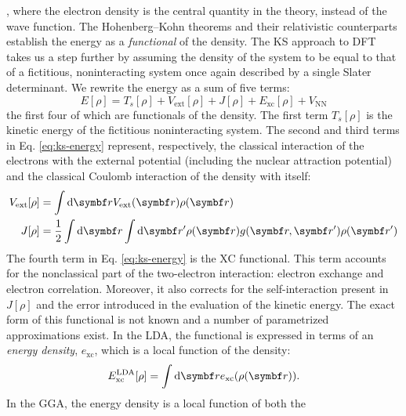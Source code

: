 , where the electron density
is the central quantity in the theory, instead of the wave function.
The Hohenberg--Kohn theorems\autocite{Hohenberg1964-wo, Eschrig2012-as}
and their relativistic counterparts\autocite{Rajagopal1973-ns,
Dreizler2012-ay} establish the energy as a \emph{functional} of the
density.
The \gls{KS} approach to \acrshort{DFT} takes us a step further by
assuming the density of the system to be equal to that of a fictitious,
noninteracting system once again described by a single Slater
determinant.\autocite{Kohn1965-hg}
We rewrite the energy as a sum of five terms:
\begin{equation}\label{eq:ks-energy}
 E[\rho] = T_s[\rho] + V_\mathrm{ext}[\rho] + J[\rho] + E_\mathrm{xc}[\rho] + V_\mathrm{NN}
\end{equation}
the first four of which are functionals of the density. The first term
$T_s[\rho]$ is the kinetic energy of the fictitious noninteracting
system.
The second and third terms in Eq. \eqref{eq:ks-energy} represent,
respectively, the classical interaction of the electrons with the
external potential (including the nuclear attraction potential) and the
classical Coulomb interaction of the density with itself:
\begin{subequations}
 \begin{align}
   V_\mathrm{ext}[\rho] &= \int\diff\vect{r} V_\mathrm{ext}(\vect{r})\rho(\vect{r}) \\
   J[\rho] &=
   \frac{1}{2}\int\diff\vect{r}\int\diff\vect{r}^\prime
   \rho(\vect{r})g(\vect{r}, \vect{r}^\prime)\rho(\vect{r}^\prime)
 \end{align}
\end{subequations}
The fourth term in Eq. \eqref{eq:ks-energy} is the \gls{XC} functional.
This term accounts for the nonclassical part of the two-electron
interaction: electron exchange and electron correlation.
Moreover, it also corrects for the self-interaction present in $J[\rho]$
and the error introduced in the evaluation of the kinetic energy.
The exact form of this functional is not known and a number of
parametrized approximations exist.\autocite{Koch2015-wq}
In the \gls{LDA}, the functional is expressed in terms of an
\emph{energy density}, $e_\mathrm{xc}$, which is a local function of the
density:
\begin{equation}
 E^\mathrm{LDA}_\mathrm{xc}[\rho] = \int \diff\vect{r}e_\mathrm{xc}(\rho(\vect{r})).
\end{equation}
In the \gls{GGA}, the energy density is a local function of both the
